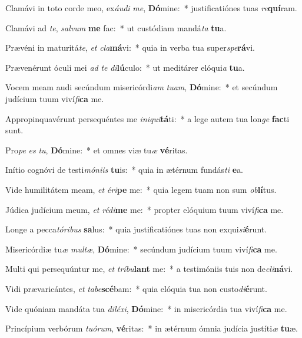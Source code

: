 \item Clamávi in toto corde meo, ex\textit{áu}\textit{di} \textit{me}, \textbf{Dó}mine:~* justificatiónes tuas \textit{re}\textbf{quí}ram.
\item Clamávi ad \textit{te}, \textit{sal}\textit{vum} \textbf{me} fac:~* ut custódiam mandá\textit{ta} \textbf{tu}a.
\item Prævéni in maturitá\textit{te}, \textit{et} \textit{cla}\textbf{má}vi:~* quia in verba tua super\textit{spe}\textbf{rá}vi.
\item Prævenérunt óculi mei \textit{ad} \textit{te} \textit{di}\textbf{lú}culo:~* ut meditárer elóqui\textit{a} \textbf{tu}a.
\item Vocem meam audi secúndum misericórdi\textit{am} \textit{tu}\textit{am}, \textbf{Dó}mine:~* et secúndum judícium tuum viví\textit{fi}\textbf{ca} me.
\item Appropinquavérunt persequéntes me \textit{in}\textit{i}\textit{qui}\textbf{tá}ti:~* a lege autem tua lon\textit{ge} \textbf{fac}ti sunt.
\item Pro\textit{pe} \textit{es} \textit{tu}, \textbf{Dó}mine:~* et omnes viæ tu\textit{æ} \textbf{vé}ritas.
\item Inítio cognóvi de testi\textit{mó}\textit{ni}\textit{is} \textbf{tu}is:~* quia in ætérnum fundás\textit{ti} \textbf{e}a.
\item Vide humilitátem meam, \textit{et} \textit{é}\textit{ri}\textbf{pe} me:~* quia legem tuam non sum \textit{ob}\textbf{lí}tus.
\item Júdica judícium meum, \textit{et} \textit{réd}\textit{i}\textbf{me} me:~* propter elóquium tuum viví\textit{fi}\textbf{ca} me.
\item Longe a pecca\textit{tó}\textit{ri}\textit{bus} \textbf{sa}lus:~* quia justificatiónes tuas non exqui\textit{si}\textbf{é}runt.
\item Misericórdiæ tu\textit{æ} \textit{mul}\textit{tæ}, \textbf{Dó}mine:~* secúndum judícium tuum viví\textit{fi}\textbf{ca} me.
\item Multi qui persequúntur me, \textit{et} \textit{trí}\textit{bu}\textbf{lant} me:~* a testimóniis tuis non de\textit{cli}\textbf{ná}vi.
\item Vidi prævaricántes, \textit{et} \textit{ta}\textit{be}\textbf{scé}bam:~* quia elóquia tua non custo\textit{di}\textbf{é}runt.
\item Vide quóniam mandáta tua \textit{di}\textit{lé}\textit{xi}, \textbf{Dó}mine:~* in misericórdia tua viví\textit{fi}\textbf{ca} me.
\item Princípium verbórum \textit{tu}\textit{ó}\textit{rum}, \textbf{vé}ritas:~* in ætérnum ómnia judícia justíti\textit{æ} \textbf{tu}æ.
